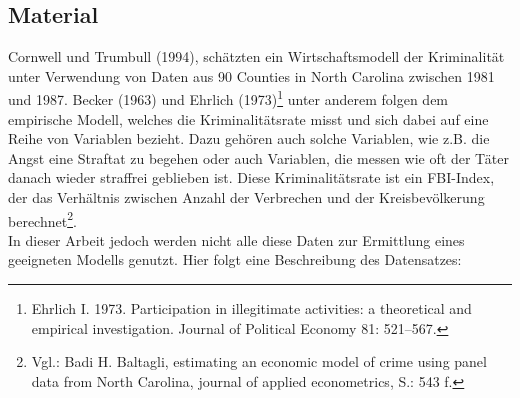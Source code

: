 \subsection{Material}
Cornwell und Trumbull (1994), sch\"atzten ein Wirtschaftsmodell der Kriminalit\"at unter Verwendung von Daten aus 90 Counties in North Carolina zwischen 1981 und 1987. 
Becker (1963) und Ehrlich (1973)\footnote{Ehrlich I. 1973. Participation in illegitimate activities: a theoretical and empirical investigation. Journal of Political Economy 81: 521–567.\label{ftn:ehr}} unter anderem folgen dem empirische Modell, welches die Kriminalit\"atsrate misst und sich dabei auf eine Reihe von Variablen bezieht. 
Dazu geh\"oren auch solche Variablen, wie z.B. die Angst eine Straftat zu begehen oder auch Variablen, die messen wie oft der T\"ater danach wieder straffrei geblieben ist.
Diese Kriminalit\"atsrate ist ein FBI-Index, der das Verh\"altnis zwischen Anzahl der Verbrechen und der Kreisbev\"olkerung berechnet\footnote{Vgl.: Badi H. Baltagli, estimating an economic model of crime using panel data from North Carolina, journal of applied econometrics, S.: 543 f.}. \\
In dieser Arbeit jedoch werden nicht alle diese Daten zur Ermittlung eines geeigneten Modells genutzt.
Hier folgt eine Beschreibung des Datensatzes: \\

